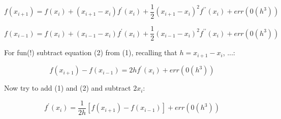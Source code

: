 \documentclass[12pt]{article}
\begin{document}
\begin{equation}
 f(x_{i+1}) = f(x_i) + (x_{i+1} - x_i)f^{\prime}(x_i) + \frac{1}{2}(x_{i+1} - x_i)^2 f^{\prime\prime}(x_i) + err(0(h^3))
\end {equation}

\begin{equation}
 f(x_{i-1}) = f(x_i) + (x_{i-1} - x_i) f^{\prime}(x_i) + \frac{1}{2}(x_{i-1} - x_i)^2 f^{\prime\prime}(x_i) + err(0(h^3))
\end {equation}

\noindent For fun(!) subtract equation (2) from (1), recalling that $h = x_{i+1} - x_i$, ...:

\begin{equation}
 f(x_{i+1}) - f(x_{i-1}) = 2hf^{\prime}(x_i) + err(0(h^3))
\end {equation}

\noindent Now try to add (1) and (2) and subtract $2x_i$:

\begin{equation}
 f^{\prime}(x_i) = \frac{1}{2h}[f(x_{i+1}) - f(x_{i-1})] + err(0(h^3))
 \end {equation}
\end{document}

